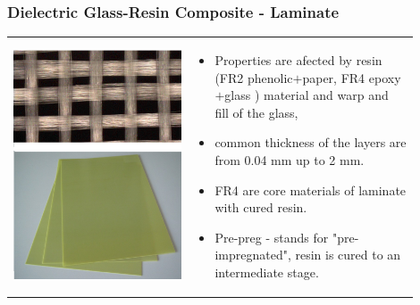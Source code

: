 \documentclass{beamer}
\begin{document}
	\begin{frame}
    \frametitle{Dielectric Glass-Resin Composite - Laminate}
		\small
		\begin{center}
			\begin{tabular}{m{0.4\linewidth} m{0.5\linewidth}}
			\includegraphics[scale=0.2]{obr23_FR4.png} &
			
			\begin{itemize}
				\item Properties are afected by resin (FR2 phenolic$+$paper, FR4 epoxy$+$glass ) material and warp and fill of the glass,
				\item common thickness of the layers are from 0.04 mm up to 2 mm.
				\item FR4 are core materials of laminate with cured resin.
				\item Pre-preg - stands for "pre-impregnated", resin is cured to an intermediate stage.
			\end{itemize}
			\end{tabular}
		\end{center}
	\end{frame}
\end{document}
